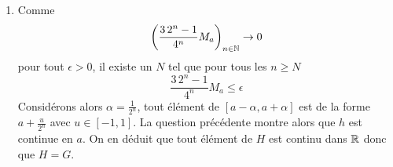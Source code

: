 \begin{enumerate}
\item  Comme 
\[\left( \frac{3\,2^n-1}{4^n}M_a\right) _{n\in \mathbb{N}}\rightarrow 0\]
pour tout $\epsilon>0$, il existe un $N$ tel que pour tous les $n\geq N$
\[\frac{3\,2^n-1}{4^n}M_a\leq \epsilon\]
Considérons alors $\alpha=\frac{1}{2^n}$, tout élément de $[a-\alpha , a+\alpha ]$ est de la forme
$a+\frac{u}{2^n}$ avec $u\in [-1,1]$. La question pr{\'e}c{\'e}dente montre alors que $h$ est continue en $a$.\newline
On en déduit que tout {\'e}l{\'e}ment de $H$ est continu dans $\mathbb{R}$ donc que $H=G$.
\end{enumerate}
